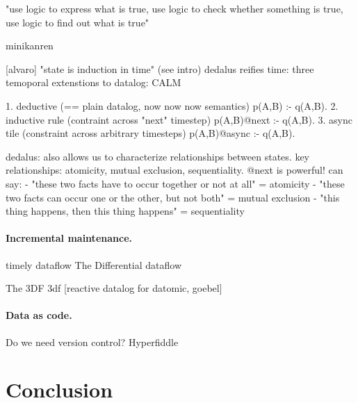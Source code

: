"use logic to express what is true, use logic to check whether something is true, use logic to find out what is true" \cite{sicp}

minikanren \cite{byrd2010relational}


[alvaro] "state is induction in time" (see intro) dedalus \cite{alvaro2010dedalus} reifies time: three temoporal extenstions to datalog:
\gls{CALM} \cite{alvaro2011consistency}

1. deductive (== plain datalog, now now now semantics) p(A,B) :- q(A,B).
2. inductive rule (contraint across "next" timestep) p(A,B)@next :- q(A,B).
3. async tile (constraint across arbitrary timesteps) p(A,B)@async :- q(A,B).

dedalus: also allows us to characterize relationships between states.
key relationships: atomicity, mutual exclusion, sequentiality.
@next is powerful! can say:
- "these two facts have to occur together or not at all" = atomicity
- "these two facts can occur one or the other, but not both" = mutual exclusion
- "this thing happens, then this thing happens" = sequentiality


\paragraph{Incremental maintenance.}

\cite{green2013datalog}
timely dataflow \cite{murray2013naiad}
The Differential dataflow \cite{mcsherry2013differential}

The 3DF
3df [reactive datalog for datomic, goebel] \cite{gobel2019optimising}


\paragraph{Data as code.}
Do we need version control?
Hyperfiddle \cite{getz18hyperfiddle}


\cleardoublepage
\section{Conclusion}
